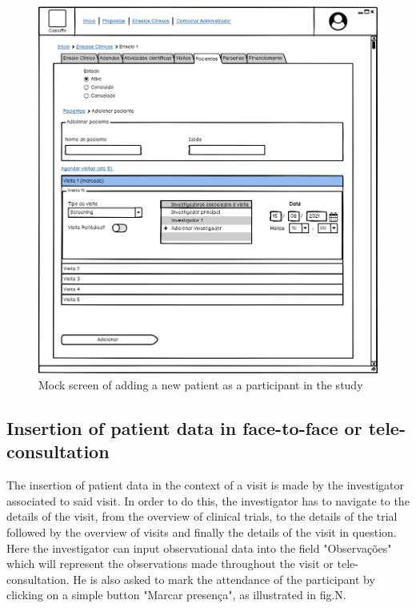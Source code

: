 \begin{figure}
    \centering
    \includegraphics{images/ensaio-adicionar-paciente.png}
    \caption{Mock screen of adding a new patient as a participant in the study}
    \label{fig:ensaio-adicionar-participante}
\end{figure}

\subsection{Insertion of patient data in face-to-face or tele-consultation}
The insertion of patient data in the context of a visit is made by the investigator associated to said visit. In order to do this, the investigator has to navigate to the details of the visit, from the overview of clinical trials, to the details of the trial followed by the overview of visits and finally the details of the visit in question. Here the investigator can input observational data into the field "Observações" which will represent the observations made throughout the visit or tele-consultation. He is also asked to mark the attendance of the participant by clicking on a simple button "Marcar presença", as illustrated in fig.N.

